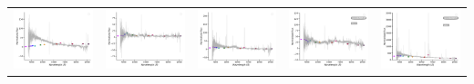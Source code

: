 \begin{center}
\begin{longtable}{l l l l l }
    \includegraphics[width=0.19\linewidth, clip]{Figs/Figs-lamost/spec-55859-F5907_sp13-145-STRIPE82-0067-049701.pdf} & \includegraphics[width=0.19\linewidth, clip]{Figs/Figs-lamost/spec-55859-F5907_sp14-024-STRIPE82-0062-010390.pdf} & \includegraphics[width=0.19\linewidth, clip]{Figs/Figs-lamost/spec-55859-F5907_sp15-171-STRIPE82-0064-031755.pdf} & \includegraphics[width=0.19\linewidth, clip]{Figs/Figs-lamost/spec-55859-F5907_sp16-143-STRIPE82-0064-069216.pdf} & \includegraphics[width=0.19\linewidth, clip]{Figs/Figs-lamost/spec-55893-F9304_sp12-121-STRIPE82-0059-052699.pdf} \\

\end{longtable}
\end{center}
